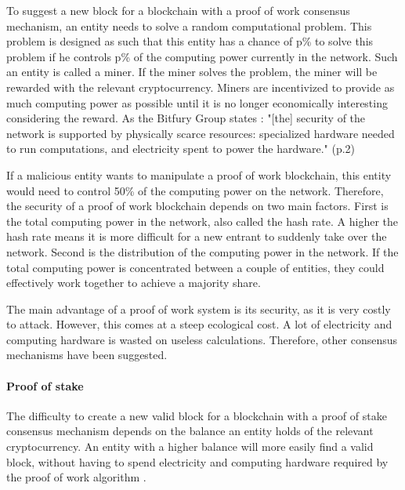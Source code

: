 \iffalse
TODO: maybe add a small part about the alternative to a mining: merged mining and anchoring (cfr bitfury - group publc vs private prt 1)
\fi

To suggest a new block for a blockchain with a proof of work consensus mechanism, an entity needs to solve a random computational problem. This problem is designed as such that this entity has a chance of p\% to solve this problem if he controls p\% of the computing power currently in the network. Such an entity is called a miner. If the miner solves the problem, the miner will be rewarded with the relevant cryptocurrency. Miners are incentivized to provide as much computing power as possible until it is no longer economically interesting considering the reward. As the Bitfury Group states \cite{bitfury-pos-vs-pow}: "[the] security of the network is supported by physically scarce resources: specialized hardware needed to run computations, and electricity spent to power the hardware." (p.2)

If a malicious entity wants to manipulate a proof of work blockchain, this entity would need to control 50\% of the computing power on the network. Therefore, the security of a proof of work blockchain depends on two main factors. First is the total computing power in the network, also called the hash rate. A higher the hash rate means it is more difficult for a new entrant to suddenly take over the network. Second is the distribution of the computing power in the network. If the total computing power  is concentrated between a couple of entities, they could effectively work together to achieve a majority share.

The main advantage of a proof of work system is its security, as it is very costly to attack. However, this comes at a steep ecological cost. A lot of electricity and computing hardware is wasted on useless calculations. Therefore, other consensus mechanisms have been suggested.

\paragraph{Proof of stake}

The difficulty to create a new valid block for a blockchain with a proof of stake consensus mechanism depends on the balance an entity holds of the relevant cryptocurrency. An entity with a higher balance will more easily find a valid block, without having to spend electricity and computing hardware required by the proof of work algorithm \cite{bitfury-pos-vs-pow}.

